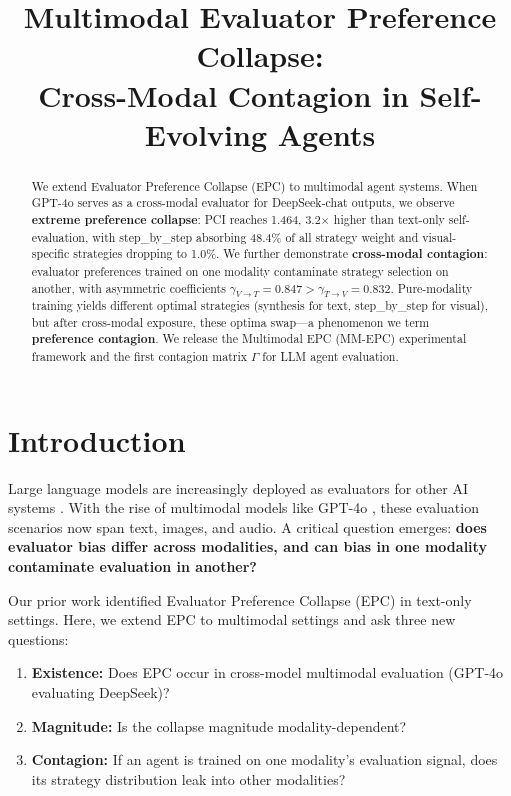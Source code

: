 \documentclass[11pt,a4paper]{article}
\title{\Large\textbf{Multimodal Evaluator Preference Collapse: \\Cross-Modal Contagion in Self-Evolving Agents}}
\date{}
\begin{document}
\maketitle

\begin{abstract}
We extend Evaluator Preference Collapse (EPC) to multimodal agent systems. When GPT-4o serves as a cross-modal evaluator for DeepSeek-chat outputs, we observe \textbf{extreme preference collapse}: PCI reaches 1.464, 3.2$\times$ higher than text-only self-evaluation, with step\_by\_step absorbing 48.4\% of all strategy weight and visual-specific strategies dropping to 1.0\%. We further demonstrate \textbf{cross-modal contagion}: evaluator preferences trained on one modality contaminate strategy selection on another, with asymmetric coefficients $\gamma_{V\to T}=0.847 > \gamma_{T\to V}=0.832$. Pure-modality training yields different optimal strategies (synthesis for text, step\_by\_step for visual), but after cross-modal exposure, these optima swap---a phenomenon we term \textbf{preference contagion}. We release the Multimodal EPC (MM-EPC) experimental framework and the first contagion matrix $\Gamma$ for LLM agent evaluation.
\end{abstract}

\section{Introduction}

Large language models are increasingly deployed as evaluators for other AI systems \cite{zheng2023judging, chiang2024chatbot}. With the rise of multimodal models like GPT-4o \cite{openai2024gpt4o}, these evaluation scenarios now span text, images, and audio. A critical question emerges: \textbf{does evaluator bias differ across modalities, and can bias in one modality contaminate evaluation in another?}

Our prior work identified Evaluator Preference Collapse (EPC) in text-only settings. Here, we extend EPC to multimodal settings and ask three new questions:

\begin{enumerate}[leftmargin=*]
    \item \textbf{Existence:} Does EPC occur in cross-model multimodal evaluation (GPT-4o evaluating DeepSeek)?
    \item \textbf{Magnitude:} Is the collapse magnitude modality-dependent?
    \item \textbf{Contagion:} If an agent is trained on one modality's evaluation signal, does its strategy distribution leak into other modalities?
\end{enumerate}
\end{document}
